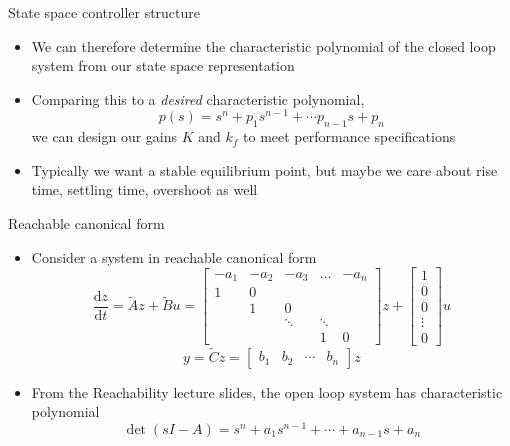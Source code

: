 \documentclass{beamer-control}
\begin{document}
\begin{frame}{State space controller structure}
	\begin{itemize}
		\item We can therefore determine the characteristic polynomial of the closed loop system from our state space representation
		\item Comparing this to a \textit{desired} characteristic polynomial,
		\[p(s) = s^n + p_1 s^{n-1} + \cdots p_{n-1} s + p_n\] 
		we can design our gains $K$ and $k_f$ to meet performance specifications 
		\item Typically we want a stable equilibrium point, but maybe we care about rise time, settling time, overshoot as well 
	\end{itemize}
\end{frame}


\begin{frame}{Reachable canonical form}
\begin{itemize}
\item Consider a system in reachable canonical form
\[\frac{\mathrm{d} z}{\mathrm{d} t}=\tilde{A} z+\tilde{B} u=\begin{bmatrix}
	-a_1 & -a_2 & -a_3 & \ldots & -a_n \\
	1 & 0 & & &  \\
	& 1 & 0 & & \\
	& & \ddots & \ddots & \\
	& & & 1 & 0
\end{bmatrix} z+\begin{bmatrix}
	1 \\
	0 \\
	0 \\
	\vdots \\
	0
\end{bmatrix} u\]
\[  y=\tilde{C} z=\begin{bmatrix}
	b_1 & b_2 & \cdots & b_n
\end{bmatrix}z \]
\item From the Reachability lecture slides, the open loop system has characteristic polynomial
\[\operatorname{det}(sI-A) = s^n+a_1s^{n-1}+\cdots + a_{n-1}s+a_n\]
\end{itemize}
\end{frame}
\end{document}
